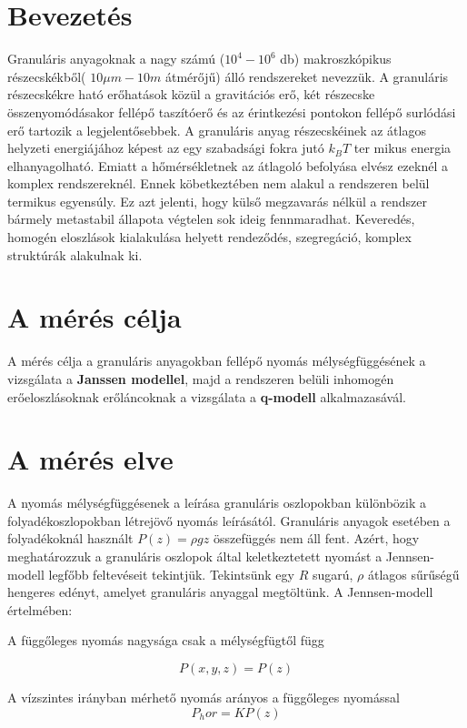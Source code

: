 \documentclass{article}
\begin{document}
	\section{Bevezetés}
	Granuláris anyagoknak a nagy számú ($10^4 - 10^6$ db) makroszkópikus részecskékből( $10 \mu m - 10 m$ átmérőjű)  álló rendszereket nevezzük.  A granuláris részecskékre ható erőhatások közül a gravitációs erő, két részecske összenyomódásakor fellépő taszítóerő és az érintkezési pontokon fellépő surlódási erő tartozik a legjelentősebbek. A granuláris anyag részecskéinek az átlagos helyzeti energiájához képest az egy szabadsági fokra jutó $k_BT$ ter mikus energia elhanyagolható. Emiatt a hőmérsékletnek az átlagoló befolyása elvész ezeknél a komplex rendszereknél. Ennek köbetkeztében nem alakul a rendszeren belül termikus egyensúly. Ez azt jelenti, hogy külső megzavarás nélkül a rendszer bármely metastabil állapota végtelen sok ideig fennmaradhat. Keveredés, homogén eloszlások kialakulása helyett rendeződés, szegregáció, komplex struktúrák alakulnak ki.
	
	\section{A mérés célja}
	
	A mérés célja a granuláris anyagokban fellépő nyomás mélységfüggésének a vizsgálata a \textbf{Janssen modellel}, majd a rendszeren belüli inhomogén erőeloszlásoknak erőláncoknak a vizsgálata a \textbf{q-modell} alkalmazasávál.
	
	\section{A mérés elve}
	
	A nyomás mélységfüggésenek a leírása granuláris oszlopokban különbözik a folyadékoszlopokban létrejövő nyomás leírásától. Granuláris anyagok esetében a folyadékoknál használt $P(z)=\rho gz$ összefüggés nem áll fent. Azért, hogy meghatározzuk a granuláris oszlopok által keletkeztetett nyomást a Jennsen-modell legfőbb feltevéseit tekintjük.
	Tekintsünk egy $R$ sugarú, $\rho$ átlagos sűrűségű hengeres edényt, amelyet granuláris anyaggal megtöltünk.
	A Jennsen-modell értelmében:
	
	A függőleges nyomás nagysága csak a mélységfügtől függ
	
	$$P(x,y,z)=P(z)$$
	
	A vízszintes irányban mérhető nyomás arányos a függőleges nyomással
	$$P_hor=KP( z )$$
	
\end{document}
